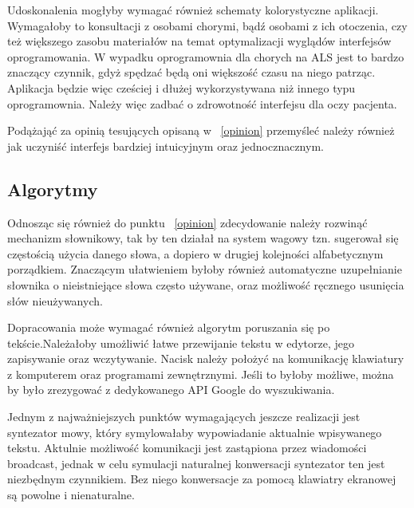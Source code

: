 \documentclass[twoside,a4paper]{book}
\begin{document}
Udoskonalenia mogłyby wymagać również schematy kolorystyczne aplikacji. Wymagałoby to konsultacji z osobami chorymi, bądź osobami z ich otoczenia, czy też większego zasobu materiałów na temat optymalizacji wyglądów interfejsów oprogramowania. W wypadku oprogramownia dla chorych na ALS jest to bardzo znaczący czynnik, gdyż spędzać będą oni większość czasu na niego patrząc. Aplikacja będzie więc cześciej i dłużej wykorzystywana niż innego typu oprogramownia. Należy więc zadbać o zdrowotność interfejsu dla oczy pacjenta.  

Podążająć za opinią tesujących  opisaną w ~\ref{opinion}  przemyśleć należy również jak uczyniść interfejs bardziej intuicyjnym oraz jednocznacznym. 
\subsection{Algorytmy}
Odnosząc się również do punktu ~\ref{opinion} zdecydowanie należy rozwinąć mechanizm słownikowy, tak by ten działał na system wagowy tzn. sugerował się częstością użycia danego słowa, a dopiero w drugiej kolejności alfabetycznym porządkiem. Znaczącym ułatwieniem byłoby również automatyczne uzupełnianie słownika o nieistniejące słowa często używane, oraz możliwość ręcznego usunięcia słów nieużywanych. 

Dopracowania może wymagać również algorytm poruszania się po tekście.Należałoby umożliwić łatwe przewijanie tekstu w edytorze, jego zapisywanie oraz wczytywanie. Nacisk należy położyć na komunikację klawiatury z komputerem oraz programami zewnętrznymi.  Jeśli to byłoby możliwe, można by było zrezygować z dedykowanego API Google do wyszukiwania. 

Jednym z najważniejszych punktów wymagających jeszcze realizacji jest syntezator mowy, który symylowałaby wypowiadanie aktualnie wpisywanego tekstu. Aktulnie możliwość komunikacji jest zastąpiona przez wiadomości broadcast, jednak w celu symulacji naturalnej konwersacji syntezator ten jest niezbędnym czynnikiem. Bez niego konwersacje za pomocą klawiatry ekranowej są powolne i nienaturalne.
 
\end{document}
